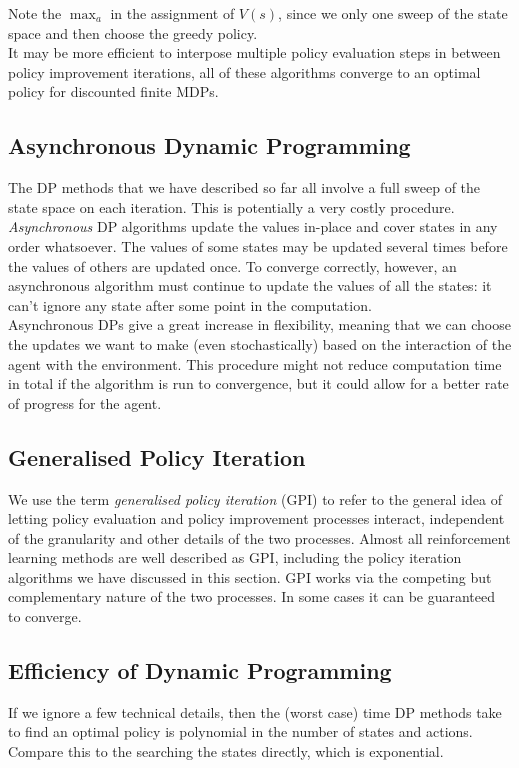Note the $\max_a$ in the assignment of $V(s)$, since we only one sweep of the state space and then choose the greedy policy.\\

It may be more efficient to interpose multiple policy evaluation steps in between policy improvement iterations, all of these algorithms converge to an optimal policy for discounted finite MDPs. 

\subsection{Asynchronous Dynamic Programming}
The DP methods that we have described so far all involve a full sweep of the state space on each iteration. This is potentially a very costly procedure. \\

\emph{Asynchronous} DP algorithms update the values in-place and cover states in any order whatsoever. The values of some states may be updated several times before the values of others are updated once. To converge correctly, however, an asynchronous algorithm must continue to update the values of all the states: it can’t ignore any state after some point in the computation.\\

Asynchronous DPs give a great increase in flexibility, meaning that we can choose the updates we want to make (even stochastically) based on the interaction of the agent with the environment. This procedure might not reduce computation time in total if the algorithm is run to convergence, but it could allow for a better rate of progress for the agent.

\subsection{Generalised Policy Iteration}
We use the term \emph{generalised policy iteration} (GPI) to refer to the general idea of letting policy evaluation and policy improvement processes interact, independent of the granularity and other details of the two processes. Almost all reinforcement learning methods are well described as GPI, including the policy iteration algorithms we have discussed in this section. GPI works via the competing but complementary nature of the two processes. In some cases it can be guaranteed to converge. 

\subsection{Efficiency of Dynamic Programming}
If we ignore a few technical details, then the (worst case) time DP methods take to find an optimal policy is polynomial in the number of states and actions. Compare this to the searching the states directly, which is exponential.